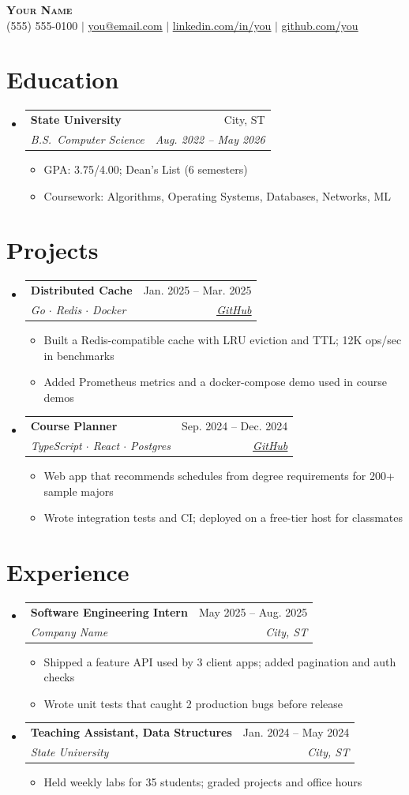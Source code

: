 \documentclass[letterpaper,11pt]{article}
\makeatletter
\newcommand{\resumeItem}[1]{
  \item\small{
    {#1 \vspace{-2pt}}
  }
}
\newcommand{\resumeSubheading}[4]{
  \vspace{-2pt}\item
    \begin{tabular*}{0.97\textwidth}[t]{l@{\extracolsep{\fill}}r}
      \textbf{#1} & #2 \\
      \textit{\small#3} & \textit{\small #4} \\
    \end{tabular*}\vspace{-7pt}
}
\newcommand{\resumeSubHeadingListStart}{\begin{itemize}[leftmargin=0.15in, label={}]}
\newcommand{\resumeSubHeadingListEnd}{\end{itemize}}
\newcommand{\resumeItemListStart}{\begin{itemize}}
\newcommand{\resumeItemListEnd}{\end{itemize}\vspace{-5pt}}
\makeatother
\begin{document}
\begin{center}
    \textbf{\Huge \scshape Your Name} \\ \vspace{1pt}
    \small (555) 555-0100 $|$ \href{mailto:you@email.com}{\underline{you@email.com}} $|$
    \href{https://linkedin.com/in/you}{\underline{linkedin.com/in/you}} $|$
    \href{https://github.com/you}{\underline{github.com/you}}
\end{center}

\section{Education}
  \resumeSubHeadingListStart
    \resumeSubheading
      {State University}{City, ST}
      {B.S.\ Computer Science}{Aug. 2022 -- May 2026}
      \resumeItemListStart
        \resumeItem{GPA: 3.75/4.00; Dean's List (6 semesters)}
        \resumeItem{Coursework: Algorithms, Operating Systems, Databases, Networks, ML}
      \resumeItemListEnd
  \resumeSubHeadingListEnd

\section{Projects}
  \resumeSubHeadingListStart
    \resumeSubheading
      {Distributed Cache}{Jan. 2025 -- Mar. 2025}
      {Go $\cdot$ Redis $\cdot$ Docker}{\href{https://github.com/you/cache}{\underline{GitHub}}}
      \resumeItemListStart
        \resumeItem{Built a Redis-compatible cache with LRU eviction and TTL; 12K ops/sec in benchmarks}
        \resumeItem{Added Prometheus metrics and a docker-compose demo used in course demos}
      \resumeItemListEnd
    \resumeSubheading
      {Course Planner}{Sep. 2024 -- Dec. 2024}
      {TypeScript $\cdot$ React $\cdot$ Postgres}{\href{https://github.com/you/planner}{\underline{GitHub}}}
      \resumeItemListStart
        \resumeItem{Web app that recommends schedules from degree requirements for 200+ sample majors}
        \resumeItem{Wrote integration tests and CI; deployed on a free-tier host for classmates}
      \resumeItemListEnd
  \resumeSubHeadingListEnd

\section{Experience}
  \resumeSubHeadingListStart
    \resumeSubheading
      {Software Engineering Intern}{May 2025 -- Aug. 2025}
      {Company Name}{City, ST}
      \resumeItemListStart
        \resumeItem{Shipped a feature API used by 3 client apps; added pagination and auth checks}
        \resumeItem{Wrote unit tests that caught 2 production bugs before release}
      \resumeItemListEnd
    \resumeSubheading
      {Teaching Assistant, Data Structures}{Jan. 2024 -- May 2024}
      {State University}{City, ST}
      \resumeItemListStart
        \resumeItem{Held weekly labs for 35 students; graded projects and office hours}
      \resumeItemListEnd
  \resumeSubHeadingListEnd
\end{document}
